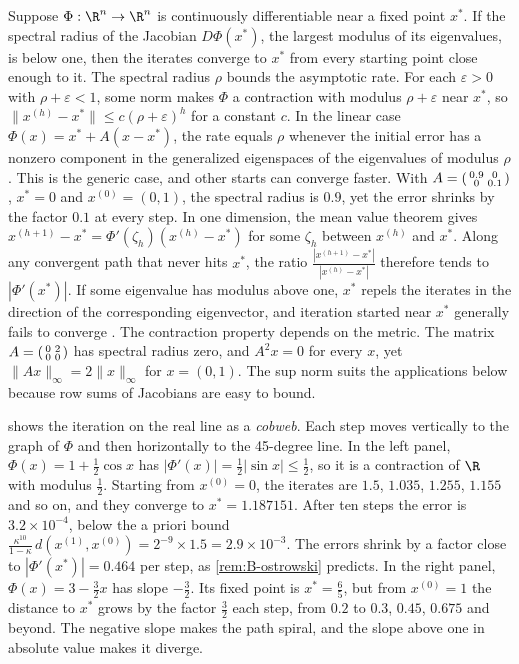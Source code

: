 \begin{remark}\label{rem:B-ostrowski}
Suppose $\Phi: \R^n \to \R^n$ is continuously differentiable near a fixed point $x^*$. If the spectral radius
of the Jacobian $D\Phi(x^*)$, the largest modulus of its eigenvalues, is below one, then the iterates
converge to $x^*$ from every starting point close enough to it. The spectral radius $\rho$ bounds the
asymptotic rate. For each $\varepsilon > 0$ with $\rho + \varepsilon < 1$, some norm makes $\Phi$ a contraction
with modulus $\rho + \varepsilon$ near $x^*$, so $\|x^{(h)} - x^*\| \leq c(\rho + \varepsilon)^h$ for a constant
$c$. In the linear case $\Phi(x) = x^* + A(x - x^*)$, the rate equals $\rho$ whenever the initial error has a
nonzero component in the generalized eigenspaces of the eigenvalues of modulus $\rho$. This is the generic
case, and other starts can converge faster. With $A = \begin{psmallmatrix}0.9 & 0\\ 0 & 0.1\end{psmallmatrix}$,
$x^* = 0$ and $x^{(0)} = (0, 1)$, the spectral radius is $0.9$, yet the error shrinks by the factor $0.1$ at
every step. In one dimension, the mean value theorem gives $x^{(h+1)} - x^* = \Phi'(\zeta_h)(x^{(h)} - x^*)$
for some $\zeta_h$ between $x^{(h)}$ and $x^*$. Along any convergent path that never hits $x^*$, the ratio
$\frac{|x^{(h+1)} - x^*|}{|x^{(h)} - x^*|}$ therefore tends to $|\Phi'(x^*)|$. If some eigenvalue has modulus above one, $x^*$ repels the iterates in the direction of the
corresponding eigenvector, and iteration started near $x^*$ generally fails to converge \citep{Judd1998}.
The contraction property depends on the metric. The matrix $A = \begin{psmallmatrix}0 & 2\\ 0 &
0\end{psmallmatrix}$ has spectral radius zero, and $A^2x = 0$ for every $x$, yet $\|Ax\|_\infty = 2\|x\|_\infty$
for $x = (0, 1)$. The sup norm suits the applications below because row sums of Jacobians are easy to bound.
\end{remark}

 shows the iteration on the real line as a \emph{cobweb}. Each step moves vertically to
the graph of $\Phi$ and then horizontally to the 45-degree line. In the left panel, $\Phi(x) = 1 +
\frac{1}{2}\cos x$ has $|\Phi'(x)| = \frac{1}{2}|\sin x| \leq \frac{1}{2}$, so it is a contraction of $\R$ with
modulus $\frac{1}{2}$. Starting from $x^{(0)} = 0$, the iterates are $1.5$, $1.035$, $1.255$, $1.155$ and so on,
and they converge to $x^* = 1.187151$. After ten steps the error is $3.2 \times 10^{-4}$, below the a priori
bound $\frac{\kappa^{10}}{1 - \kappa}\,d(x^{(1)}, x^{(0)}) = 2^{-9} \times 1.5 = 2.9 \times 10^{-3}$. The errors shrink by a factor close to
$|\Phi'(x^*)| = 0.464$ per step, as \cref{rem:B-ostrowski} predicts. In the right panel, $\Phi(x) = 3 -
\frac{3}{2}x$ has slope $-\frac{3}{2}$. Its fixed point is $x^* = \frac{6}{5}$, but from $x^{(0)} = 1$ the
distance to $x^*$ grows by the factor $\frac{3}{2}$ each step, from $0.2$ to $0.3$, $0.45$, $0.675$ and
beyond. The negative slope makes the path spiral, and the slope above one in absolute value makes it diverge.

